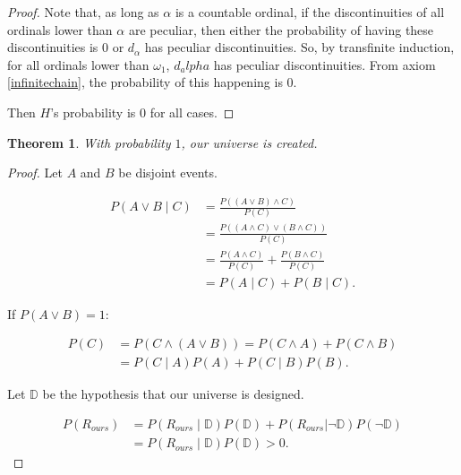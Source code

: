 \documentclass[a4paper
,draft
]{article}
\def\infordinalb{\omega_1}
\def\designer{\mathbb{D}}
\newtheorem{theorem}{Theorem}[section]
\begin{document}
\begin{proof}
Note that, as long as $\alpha$ is a countable ordinal, if the discontinuities of all ordinals lower than $\alpha$ are peculiar, then either the probability of having these discontinuities is $0$ or $d_\alpha$ has peculiar discontinuities. So, by transfinite induction, for all ordinals lower than $\infordinalb$, $d_alpha$ has peculiar discontinuities. From axiom \ref{infinitechain}, the probability of this happening is $0$.

Then $H$'s probability is $0$ for all cases.
\end{proof}

\begin{theorem}
With probability $1$, our universe is created.
\end{theorem}

\begin{proof}

Let $A$ and $B$ be disjoint events.

\begin{equation*}
\begin{split}
P(A \lor B \mid C) &= \frac{P((A \lor B) \land C)}{P(C)} \\
                   &= \frac{P((A \land C) \lor (B \land C))}{P(C)} \\
                   &= \frac{P(A \land C)}{P(C)} + \frac{P(B \land C)}{P(C)} \\
                   &= P(A\mid C) + P(B\mid C). 
\end{split}
\end{equation*}

If $P(A \lor B) = 1$:

\begin{equation*}
\begin{split}
P(C) &= P(C \land (A \lor B)) = P(C \land A) + P(C \land B) \\
      &= P(C \mid A) P(A) + P(C \mid B) P(B).
\end{split}
\end{equation*}

Let $\designer$ be the hypothesis that our universe is designed.

\begin{equation*}
\begin{split}
P(R_{ours}) &= P(R_{ours} \mid \designer) P(\designer) + P(R_{ours} | \lnot \designer) P(\lnot \designer) \\
            &= P(R_{ours} \mid \designer) P(\designer) > 0.
\end{split}
\end{equation*}


\end{proof}
\end{document}
